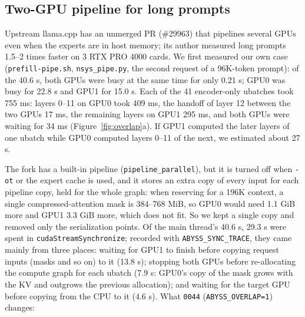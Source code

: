 \documentclass[11pt,a4paper]{article}
\newcommand{\code}[1]{\texttt{#1}}
\begin{document}
\subsection{Two-GPU pipeline for long prompts}
\label{sec:overlap}

Upstream llama.cpp has an unmerged PR (\#29963) that pipelines several GPUs even when the experts are in host memory; its author measured long prompts 1.5--2 times faster on 3 RTX PRO 4000 cards. We first measured our own case (\code{prefill-pipe.sh}, \code{nsys\_pipe.py}, the second request of a 96K-token prompt): of the 40.6 s, both GPUs were busy at the same time for only 0.21 s; GPU0 was busy for 22.8 s and GPU1 for 15.0 s. Each of the 41 encoder-only ubatches took 755 ms: layers 0--11 on GPU0 took 409 ms, the handoff of layer 12 between the two GPUs 17 ms, the remaining layers on GPU1 295 ms, and both GPUs were waiting for 34 ms (Figure~\ref{fig:overlap}a). If GPU1 computed the later layers of one ubatch while GPU0 computed layers 0--11 of the next, we estimated about 27 s.

The fork has a built-in pipeline (\code{pipeline\_parallel}), but it is turned off when \code{-ot} or the expert cache is used, and it stores an extra copy of every input for each pipeline copy, held for the whole graph: when reserving for a 196K context, a single compressed-attention mask is 384--768 MiB, so GPU0 would need 1.1 GiB more and GPU1 3.3 GiB more, which does not fit. So we kept a single copy and removed only the serialization points. Of the main thread's 40.6 s, 29.3 s were spent in \code{cudaStreamSynchronize}; recorded with \code{ABYSS\_SYNC\_TRACE}, they came mainly from three places: waiting for GPU1 to finish before copying request inputs (masks and so on) to it (13.8 s); stopping both GPUs before re-allocating the compute graph for each ubatch (7.9 s: GPU0's copy of the mask grows with the KV and outgrows the previous allocation); and waiting for the target GPU before copying from the CPU to it (4.6 s). What \code{0044} (\code{ABYSS\_OVERLAP=1}) changes:
\end{document}
